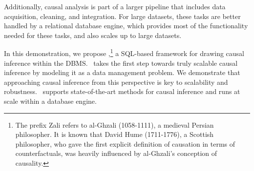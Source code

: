  Additionally, causal analysis is part of a larger pipeline that includes data acquisition,  cleaning, and integration. For large datasets, these tasks are better handled by a relational database engine, which provides most of the functionality needed for these tasks, and also scales up to large datasets. %


In this demonstration, we propose \GSQL,\footnote{ The prefix Zali refers to
  al-Ghzali (1058-1111), a medieval Persian philosopher. It is known
  that David Hume (1711-1776), a Scottish philosopher, who gave the
  first explicit definition of causation in terms of counterfactuals,
  was heavily influenced by al-Ghzali's conception of causality.}
  a SQL-based framework for drawing causal inference within the DBMS. \GSQL\ takes the first step towards truly scalable causal inference by modeling it as a data management problem. We demonstrate that
   approaching causal inference from this perspective is key to scalability and robustness.  \GSQL\ supports state-of-the-art methods for causal inference and runs at scale within a database engine.  

